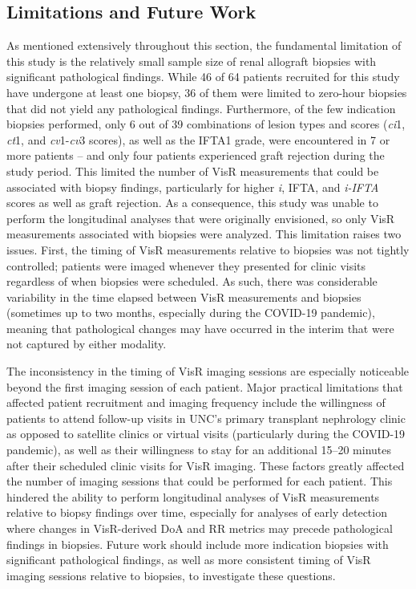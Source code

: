 \subsection{Limitations and Future Work}
\label{sec:transplantDiscussionLimitations}

As mentioned extensively throughout this section, the fundamental limitation of this study is the relatively small sample size of renal allograft biopsies with significant pathological findings. While 46 of 64 patients recruited for this study have undergone at least one biopsy, 36 of them were limited to zero-hour biopsies that did not yield any pathological findings. Furthermore, of the few indication biopsies performed, only 6 out of 39 combinations of lesion types and scores (\emph{ci}1, \emph{ct}1, and \emph{cv}1-\emph{cv}3 scores), as well as the IFTA1 grade, were encountered in 7 or more patients -- and only four patients experienced graft rejection during the study period. This limited the number of VisR measurements that could be associated with biopsy findings, particularly for higher \emph{i}, IFTA, and \emph{i-IFTA} scores as well as graft rejection. As a consequence, this study was unable to perform the longitudinal analyses that were originally envisioned, so only VisR measurements associated with biopsies were analyzed. This limitation raises two issues. First, the timing of VisR measurements relative to biopsies was not tightly controlled; patients were imaged whenever they presented for clinic visits regardless of when biopsies were scheduled. As such, there was considerable variability in the time elapsed between VisR measurements and biopsies (sometimes up to two months, especially during the COVID-19 pandemic), meaning that pathological changes may have occurred in the interim that were not captured by either modality. 

The inconsistency in the timing of VisR imaging sessions are especially noticeable beyond the first imaging session of each patient. Major practical limitations that affected patient recruitment and imaging frequency include the willingness of patients to attend follow-up visits in UNC's primary transplant nephrology clinic as opposed to satellite clinics or virtual visits (particularly during the COVID-19 pandemic), as well as their willingness to stay for an additional 15--20 minutes after their scheduled clinic visits for VisR imaging. These factors greatly affected the number of imaging sessions that could be performed for each patient. This hindered the ability to perform longitudinal analyses of VisR measurements relative to biopsy findings over time, especially for analyses of early detection where changes in VisR-derived DoA and RR metrics may precede pathological findings in biopsies. Future work should include more indication biopsies with significant pathological findings, as well as more consistent timing of VisR imaging sessions relative to biopsies, to investigate these questions.

